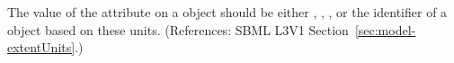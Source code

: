 The value of the attribute  on a \Model object should be
either , , ,  or the
identifier of a \UnitDefinition object based on these units.  (References:
SBML L3V1 Section~\ref{sec:model-extentUnits}.)
